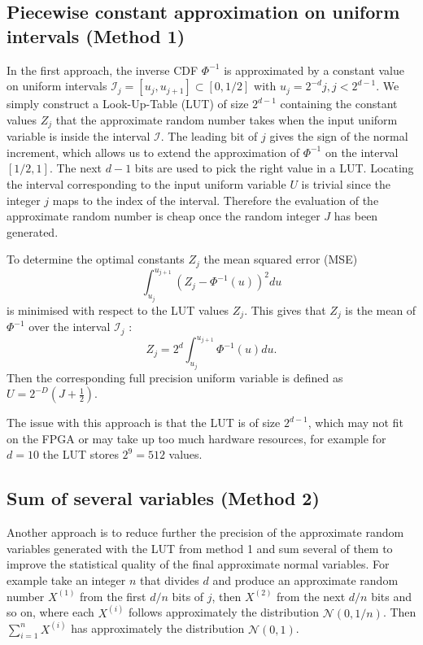 \subsection{Piecewise constant approximation on uniform intervals (Method 1)} %
In the first approach, the inverse CDF $\Phi^{-1}$ is approximated by a constant value on uniform intervals $\mathcal{I}_j=[u_j , u_{j+1}]\subset [0,1/2]$  with $u_j = 2^{-d} j, j<2^{d-1}$. We simply construct a Look-Up-Table (LUT) of size $2^{d-1}$ containing the constant values $Z_j$ that the approximate random number takes when the input uniform variable is inside the interval $\mathcal{I}$. The leading bit of $j$ gives the sign of the normal increment, which allows us to extend the approximation of $\Phi^{-1}$ on the interval $[1/2,1]$. The next $d-1$ bits are used to pick the right value in a LUT.
Locating the interval corresponding to the input uniform variable $U$ is trivial since the integer $j$ maps to the index of the interval. Therefore the evaluation of the approximate random number is cheap once the random integer $J$ has been generated.

To determine the optimal constants $Z_j$ the mean squared error (MSE)
\begin{equation}
    \int_{u_j}^{u_{j+1}} \left(Z_j-\Phi^{-1}(u) \right)^2 du
\end{equation}
is minimised with respect to the LUT values $Z_j$. This gives that $Z_j$ is the mean of $\Phi^{-1}$ over the interval $\mathcal{I}_j$ :
\begin{equation}
    Z_j = 2^d \int_{u_j}^{u_{j+1}} \Phi^{-1}(u)du.
\end{equation}
Then the corresponding full precision uniform variable is defined as $U = 2^{- D}\left(J + \frac{1}{2}\right)$. 

The issue with this approach is that the LUT is of size $2^{d-1}$, which may not fit on the FPGA or may take up too much hardware resources, for example for $d=10$ the LUT stores $2^9=512$ values.


\subsection{Sum of several variables (Method 2)} %
Another approach is to reduce further the precision of the approximate random variables generated with the LUT from method 1 and sum several of them to improve the statistical quality of the final approximate normal variables. For example take an integer $n$ that divides $d$ and produce an approximate random number $X^{(1)}$ from the first $d/n$ bits of $j$, then $X^{(2)}$ from the next $d/n$ bits and so on, where each $X^{(i)}$ follows approximately the distribution $\mathcal{N}(0,1/n)$.
Then $\sum_{i=1}^n X^{(i)}$ has approximately the distribution $\mathcal{N}(0,1)$.

